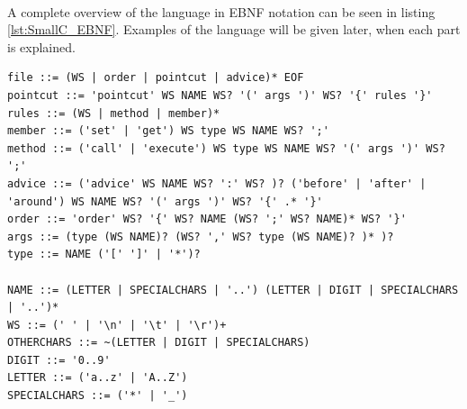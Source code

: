 \documentclass[a4paper]{report}
\begin{document}
\\
A complete overview of the language in EBNF notation can be seen in listing \ref{lst:SmallC_EBNF}. Examples of the language will be given later, when each part is explained.\\
\begin{minipage}{\linewidth}
\begin{lstlisting}[caption=EBNF notation of the aspect langauge, label=lst:SmallC_EBNF]
file ::= (WS | order | pointcut | advice)* EOF
pointcut ::= 'pointcut' WS NAME WS? '(' args ')' WS? '{' rules '}'
rules ::= (WS | method | member)*
member ::= ('set' | 'get') WS type WS NAME WS? ';'
method ::= ('call' | 'execute') WS type WS NAME WS? '(' args ')' WS? ';'
advice ::= ('advice' WS NAME WS? ':' WS? )? ('before' | 'after' | 'around') WS NAME WS? '(' args ')' WS? '{' .* '}' 
order ::= 'order' WS? '{' WS? NAME (WS? ';' WS? NAME)* WS? '}' 
args ::= (type (WS NAME)? (WS? ',' WS? type (WS NAME)? )* )?
type ::= NAME ('[' ']' | '*')?

NAME ::= (LETTER | SPECIALCHARS | '..') (LETTER | DIGIT | SPECIALCHARS | '..')* 
WS ::= (' ' | '\n' | '\t' | '\r')+
OTHERCHARS ::= ~(LETTER | DIGIT | SPECIALCHARS)
DIGIT ::= '0..9'
LETTER ::= ('a..z' | 'A..Z')
SPECIALCHARS ::= ('*' | '_')
\end{lstlisting}
\end{minipage}
\end{document}
